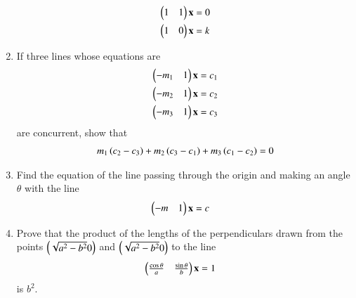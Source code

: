 \begin{enumerate}[label=\arabic*.,ref=\thesubsection.\theenumi]
\begin{align}
\begin{pmatrix}1 & 1\end{pmatrix}\mathbf{x} &= 0
\\
\begin{pmatrix}1 & 0\end{pmatrix}\mathbf{x} &= k
\end{align}
%
\item If three lines whose equations are 
%
\begin{align}
\begin{pmatrix}-m_1 & 1\end{pmatrix}\mathbf{x} &= c_1
\\
\begin{pmatrix}-m_2 & 1\end{pmatrix}\mathbf{x} &= c_2
\\
\begin{pmatrix}-m_3 & 1\end{pmatrix}\mathbf{x} &= c_3
\end{align}
%
are concurrent, show that
%
\begin{align}
m_1\left(c_2-c_3\right)+
m_2\left(c_3-c_1\right)+
m_3\left(c_1-c_2\right) = 0
\end{align}
%
\item Find the equation of the line passing through the origin and making an angle $\theta$ with the line %
\begin{align}
\begin{pmatrix}-m & 1\end{pmatrix}\mathbf{x} &= c
\end{align}
%
\item Prove that the product of the lengths of the perpendiculars drawn from the points $\begin{pmatrix}\sqrt{a^2-b^2}0\end{pmatrix}$ and $\begin{pmatrix}\sqrt{a^2-b^2}0\end{pmatrix}$ to the line 
%
\begin{align}
\begin{pmatrix}\frac{\cos\theta}{a} & \frac{\sin\theta}{b}\end{pmatrix}\mathbf{x} &= 1
\end{align}
%
is $b^2$.


\end{enumerate}
